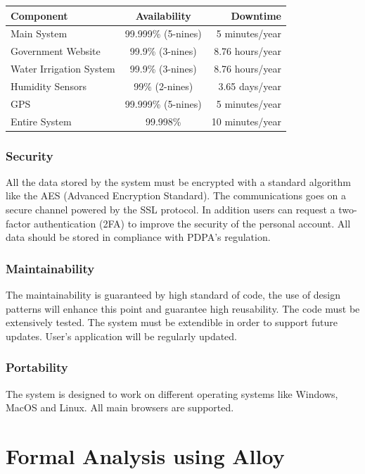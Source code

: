 \documentclass[table, 12pt]{article}
\begin{document}
\begin{table}[H]
    \begin{center}
      \label{tab:availability}
      \begin{tabular}{l|c|r}
        \textbf{Component} & \textbf{Availability} & \textbf{Downtime}\\
        \hline
        Main System & 99.999\% (5-nines) & 5 minutes/year\\
        Government Website & 99.9\% (3-nines) & 8.76 hours/year\\
        Water Irrigation System & 99.9\% (3-nines) & 8.76 hours/year\\
        Humidity Sensors & 99\% (2-nines) & 3.65 days/year\\
        GPS & 99.999\% (5-nines) & 5 minutes/year\\
        \hline
        Entire System & 99.998\% & 10 minutes/year
      \end{tabular}
    \end{center}
\end{table}

\subsubsection{Security}
All the data stored by the system must be encrypted with a standard algorithm like the AES (Advanced Encryption Standard).
The communications goes on a secure channel powered by the SSL protocol.
In addition users can request a two-factor authentication (2FA) to improve the security of the personal account.
All data should be stored in compliance with PDPA's regulation.
\subsubsection{Maintainability}
The maintainability is guaranteed by high standard of code, the use of design patterns will enhance this point and guarantee high reusability.
The code must be extensively tested.
The system must be extendible in order to support future updates.
User's application will be regularly updated.
\subsubsection{Portability}
The system is designed to work on different operating systems like Windows, MacOS and Linux.
All main browsers are supported.

\section{Formal Analysis using Alloy}
\end{document}
